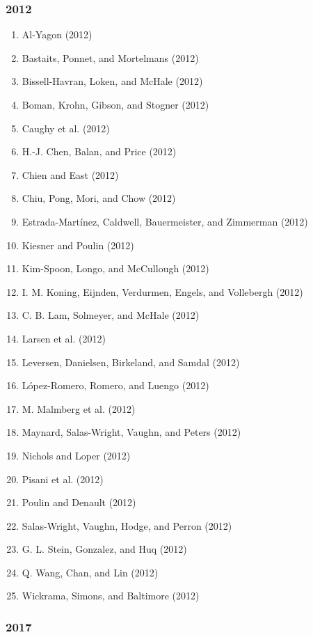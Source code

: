 \documentclass[english,man]{apa6}
\providecommand{\tightlist}{%
  \setlength{\itemsep}{0pt}\setlength{\parskip}{0pt}}
\theoremstyle{definition}
\theoremstyle{definition}
\theoremstyle{definition}
\theoremstyle{remark}
\begin{document}
\subsubsection{2012}\label{section-14}

\begin{enumerate}
\def\labelenumi{\arabic{enumi})}
\tightlist
\item
  Al-Yagon (2012)
\item
  Bastaits, Ponnet, and Mortelmans (2012)
\item
  Bissell-Havran, Loken, and McHale (2012)
\item
  Boman, Krohn, Gibson, and Stogner (2012)
\item
  Caughy et al. (2012)
\item
  H.-J. Chen, Balan, and Price (2012)
\item
  Chien and East (2012)
\item
  Chiu, Pong, Mori, and Chow (2012)
\item
  Estrada-Martínez, Caldwell, Bauermeister, and Zimmerman (2012)
\item
  Kiesner and Poulin (2012)
\item
  Kim-Spoon, Longo, and McCullough (2012)
\item
  I. M. Koning, Eijnden, Verdurmen, Engels, and Vollebergh (2012)
\item
  C. B. Lam, Solmeyer, and McHale (2012)
\item
  Larsen et al. (2012)
\item
  Leversen, Danielsen, Birkeland, and Samdal (2012)
\item
  López-Romero, Romero, and Luengo (2012)
\item
  M. Malmberg et al. (2012)
\item
  Maynard, Salas-Wright, Vaughn, and Peters (2012)
\item
  Nichols and Loper (2012)
\item
  Pisani et al. (2012)
\item
  Poulin and Denault (2012)
\item
  Salas-Wright, Vaughn, Hodge, and Perron (2012)
\item
  G. L. Stein, Gonzalez, and Huq (2012)
\item
  Q. Wang, Chan, and Lin (2012)
\item
  Wickrama, Simons, and Baltimore (2012)
\end{enumerate}

\subsubsection{2017}\label{section-15}
\end{document}
